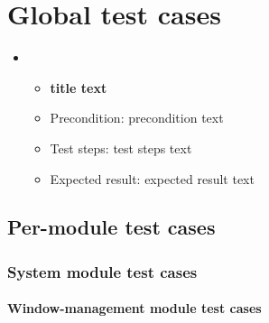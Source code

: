 \chapter{Global test cases}
\label{ch:tests}


\makeatletter
\newcommand{\fmt}[1]{(tests \specref{#1}\checknextarg}
\newcommand{\checknextarg}{\@ifnextchar\bgroup{\consumenextarg}{)}}
\newcommand{\consumenextarg}[1]{, \specref{#1}\@ifnextchar\bgroup{\consumenextarg}{)}}
\makeatother

\newcommand{\test}[5]{\addtocounter{counterTC}{10}
\item[TC\arabic{counterTC}\phantomsection\label{TC\arabic{counterTC}}\\\begin{footnotesize}\textit{#1}\end{footnotesize}]
    \begin{itemize}[noitemsep]
        \item[]{\textbf{#2}} %
        \item[]{Precondition: #3}
        \item[]{Test steps: #4}
        \item[]{Expected result: #5}
    \end{itemize}
}

\newenvironment{tests}{\begin{itemize}[font = \normalfont, style = multiline, labelwidth = 60pt, leftmargin = !]}{\end{itemize}}
    
\begin{tests}
    \test{\fmt{FS10}{FS20}{FS30}}{title text}{precondition text}{test steps text}{expected result text}
\end{tests}

\section{Per-module test cases}

\subsection{System module test cases}

\subsubsection{Window-management module test cases}

